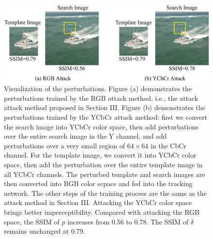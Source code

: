 \documentclass[12pt]{article}
\begin{document}
\begin{figure}[t]
  \renewcommand\thefigure{7}
  \centering
  \includegraphics[width=.8\textwidth]{images_imperceptible/1.pdf}
  \caption{Visualization of the perturbations.
  Figure (a) demonstrates the perturbations trained by the RGB attack method, i.e., the attack attack method proposed in Section III.
  Figure (b) demonstrates the perturbations trained by the YCbCr attack method: first we convert the search image into YCbCr color space, then add perturbations over the entire search image in the Y channel, and add perturbations over a very small region of $64 \times 64$ in the CbCr channel. 
  For the template image, we convert it into YCbCr color space, then add the perturbation over the entire template image in all YCbCr channels.
  The perturbed template and search images are then converted into RGB color scpace and fed into the tracking network.
  The other steps of the training process are the same as the attack method in Section III.
  Attacking the YCbCr color space brings better imperceptibility. Compared with attacking the RGB space, the SSIM of $p$ increases from 0.56 to 0.78. The SSIM of $\delta$ remains unchanged at 0.79.}
  \label{fig:YCbCr}
\end{figure}
\end{document}
